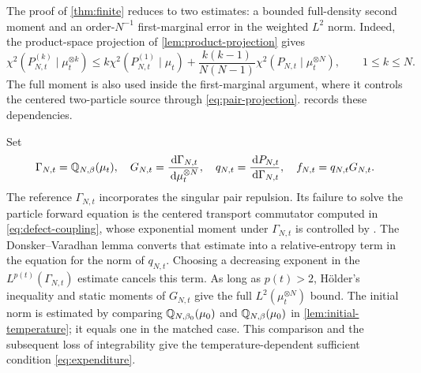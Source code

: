 \documentclass[11pt,reqno]{amsart}
\numberwithin{equation}{section}
\theoremstyle{plain}
\theoremstyle{remark}
\begin{document}
The proof of \cref{thm:finite} reduces to two estimates: a bounded full-density second moment and an order-$N^{-1}$ first-marginal error in the weighted $L^2$ norm. Indeed, the product-space projection of \cref{lem:product-projection} gives
\begin{equation}\label{eq:intro-projection-bound}
 \chi^2(P_{N,t}^{(k)}\mid\mu_t^{\otimes k})
 \le k\chi^2(P_{N,t}^{(1)}\mid\mu_t)
 +\frac{k(k-1)}{N(N-1)}\chi^2(P_{N,t}\mid\mu_t^{\otimes N}),\qquad 1\le k\le N.
\end{equation}
The full moment is also used inside the first-marginal argument, where it controls the centered two-particle source through \eqref{eq:pair-projection}.  records these dependencies.



Set
\begin{equation}\label{eq:three-densities}
 \Gamma_{N,t}=\mathbb Q_{N,\beta}(\mu_t),\quad
 G_{N,t}=\frac{\,\mathrm d\Gamma_{N,t}}{\,\mathrm d\mu_t^{\otimes N}},\quad
 q_{N,t}=\frac{\,\mathrm d P_{N,t}}{\,\mathrm d\Gamma_{N,t}},\quad
 f_{N,t}=q_{N,t}G_{N,t}.
\end{equation}
{The reference $\Gamma_{N,t}$ incorporates the singular pair repulsion.} Its failure to solve the particle forward equation is the centered transport commutator computed in \eqref{eq:defect-coupling}, whose exponential moment under $\Gamma_{N,t}$ is controlled by \cite{DGRpartition}. The Donsker--Varadhan lemma converts that estimate into a relative-entropy term in the equation for the norm of $q_{N,t}$. Choosing a decreasing exponent in the $L^{p(t)}(\Gamma_{N,t})$ estimate cancels this term. As long as $p(t)>2$, H\"older's inequality and static moments of $G_{N,t}$ give the full $L^2(\mu_t^{\otimes N})$ bound. The initial norm is estimated by comparing $\mathbb Q_{N,\beta_0}(\mu_0)$ and $\mathbb Q_{N,\beta}(\mu_0)$ in \cref{lem:initial-temperature}; it equals one in the matched case. This comparison and the subsequent loss of integrability give the temperature-dependent sufficient condition \eqref{eq:expenditure}.
\end{document}
